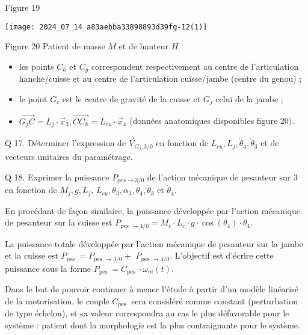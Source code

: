Figure 19

\begin{center}
\texttt{[image: 2024\_07\_14\_a83aebba33898893d39fg-12(1)]}
\end{center}

Figure 20 Patient de masse $M$ et de hauteur $H$

\begin{itemize}
  \item les points $C_{h}$ et $C_{g}$ correspondent respectivement au centre de l'articulation hanche/cuisse et au centre de l'articulation cuisse/jambe (centre du genou) ;

  \item le point $G_{c}$ est le centre de gravité de la cuisse et $G_{j}$ celui de la jambe ;

  \item $\overrightarrow{G_{j} C}=L_{j} \cdot \vec{x}_{3}, \overrightarrow{C C_{h}}=L_{c u} \cdot \vec{x}_{4}$ (données anatomiques disponibles figure 20).

\end{itemize}

Q 17. Déterminer l'expression de $\vec{V}_{G_{j}, 3 / 0}$ en fonction de $L_{c u}, L_{j}, \dot{\theta}_{4}, \dot{\theta}_{3}$ et de vecteurs unitaires du paramétrage.

Q 18. Exprimer la puissance $P_{p e s \rightarrow 3 / 0}$ de l'action mécanique de pesanteur sur 3 en fonction de $M_{j}, g, L_{j}$, $L_{c u}, \theta_{3}, \alpha_{3}, \theta_{4}, \dot{\theta}_{3}$ et $\dot{\theta}_{4}$.

En procédant de façon similaire, la puissance développée par l'action mécanique de pesanteur sur la cuisse est $P_{\text {pes } \rightarrow 4 / 0}=M_{c} \cdot L_{c} \cdot g \cdot \cos \left(\theta_{4}\right) \cdot \dot{\theta}_{4}$.

La puissance totale développée par l'action mécanique de pesanteur sur la jambe et la cuisse est $P_{\text {pes }}=P_{\text {pes } \rightarrow 3 / 0}+$ $P_{\text {pes } \rightarrow 4 / 0}$. L'objectif est d'écrire cette puissance sous la forme $P_{\text {pes }}=C_{\text {pes }} \cdot \omega_{m}(t)$.

Dans le but de pouvoir continuer à mener l'étude à partir d'un modèle linéarisé de la motorisation, le couple $C_{\text {pes }}$ sera considéré comme constant (perturbation de type échelon), et sa valeur correspondra au cas le plus défavorable pour le système : patient dont la morphologie est la plus contraignante pour le système.

